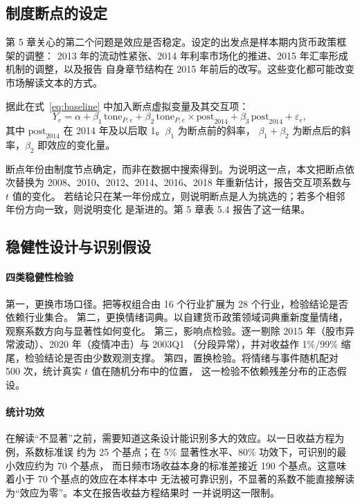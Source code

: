 \subsection{制度断点的设定}

第 5 章关心的第二个问题是效应是否稳定。设定的出发点是样本期内货币政策框架的调整：
2013 年的流动性紧张、2014 年利率市场化的推进、2015 年汇率形成机制的调整，以及报告
自身章节结构在 2015 年前后的改写。这些变化都可能改变市场解读文本的方式。

据此在式~\eqref{eq:baseline} 中加入断点虚拟变量及其交互项：
\begin{equation}
Y_e=\alpha+\beta_1\,\text{tone}_{P,e}
+\beta_2\,\text{tone}_{P,e}\times\text{post}_{2014}
+\beta_3\,\text{post}_{2014}+\varepsilon_e,
\label{eq:break}
\end{equation}
其中 $\text{post}_{2014}$ 在 2014 年及以后取 1。$\beta_1$ 为断点前的斜率，
$\beta_1+\beta_2$ 为断点后的斜率，$\beta_2$ 即效应的变化量。

断点年份由制度节点确定，而非在数据中搜索得到。为说明这一点，本文把断点依次替换为
2008、2010、2012、2014、2016、2018 年重新估计，报告交互项系数与 $t$ 值的变化。
若结论只在某一年份成立，则说明断点是人为挑选的；若多个相邻年份方向一致，则说明变化
是渐进的。第 5 章表 5.4 报告了这一结果。

\subsection{稳健性设计与识别假设}

\paragraph{四类稳健性检验}
第一，更换市场口径。把等权组合由 16 个行业扩展为 28 个行业，检验结论是否依赖行业集合。
第二，更换情绪词典。以自建货币政策领域词典重新度量情绪，观察系数方向与显著性如何变化。
第三，影响点检验。逐一剔除 2015 年（股市异常波动）、2020 年（疫情冲击）与 2003Q1
（分段异常），并对收益作 1\%/99\% 缩尾，检验结论是否由少数观测支撑。
第四，置换检验。将情绪与事件随机配对 500 次，统计真实 $t$ 值在随机分布中的位置，
这一检验不依赖残差分布的正态假设。

\paragraph{统计功效}
在解读“不显著”之前，需要知道这条设计能识别多大的效应。以一日收益方程为例，系数标准误
约为 25 个基点；在 5\% 显著性水平、80\% 功效下，可识别的最小效应约为 70 个基点，
而日频市场收益本身的标准差接近 190 个基点。这意味着小于 70 个基点的效应在本样本中
无法被可靠识别，不显著的系数不能直接解读为“效应为零”。本文在报告收益方程结果时
一并说明这一限制。

